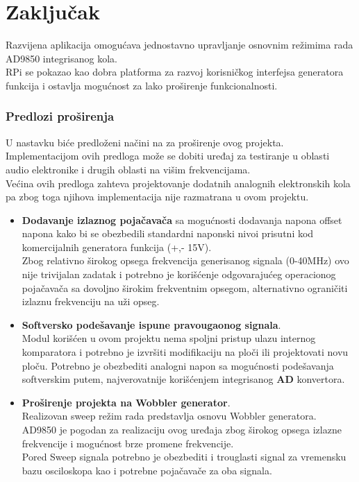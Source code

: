 \section{Zaključak}

Razvijena aplikacija omogućava jednostavno upravljanje osnovnim režimima rada
AD9850 integrisanog kola. \\
RPi se pokazao kao dobra platforma za razvoj korisničkog interfejsa generatora
funkcija i ostavlja mogućnost za lako proširenje funkcionalnosti. \\

\subsubsection{Predlozi proširenja}
U nastavku biće predloženi načini na za proširenje ovog projekta.
Implementacijom ovih predloga može se dobiti uređaj za testiranje u oblasti audio elektronike
i drugih oblasti na višim frekvencijama. \\
Većina ovih predloga zahteva projektovanje dodatnih analognih
elektronskih kola pa zbog toga njihova implementacija nije razmatrana u ovom projektu. \\

\begin{itemize}
\item \textbf{Dodavanje izlaznog pojačavača} sa mogućnosti dodavanja napona
  offset napona kako bi se obezbedili standardni naponski nivoi prisutni kod
  komercijalnih generatora funkcija (+,- 15V). \\
  Zbog relativno širokog opsega frekvencija generisanog signala (0-40MHz) ovo
  nije trivijalan zadatak i potrebno je korišćenje odgovarajućeg operacionog
  pojačavača sa dovoljno širokim frekventnim opsegom, alternativno ograničiti
  izlaznu frekvenciju na uži opseg.

\item \textbf{Softversko podešavanje ispune pravougaonog signala}. \\
  Modul korišćen u ovom projektu nema spoljni pristup ulazu internog komparatora i
  potrebno je izvršiti modifikaciju na ploči ili projektovati novu ploču.
  Potrebno je obezbediti analogni napon sa mogućnosti podešavanja softverskim
  putem, najverovatnije korišćenjem integrisanog \textbf{AD} konvertora.

\item \textbf{Proširenje projekta na Wobbler generator}. \\
  Realizovan sweep režim rada predstavlja osnovu Wobbler generatora. \\
  AD9850 je pogodan za realizaciju ovog uređaja zbog širokog opsega izlazne
  frekvencije i mogućnost brze promene frekvencije. \\
  Pored Sweep signala potrebno je obezbediti i trouglasti signal za vremensku
  bazu osciloskopa kao i potrebne pojačavače za oba signala.

\end{itemize}

